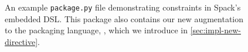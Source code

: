 \begin{figure}

\caption{An example \texttt{package.py} file demonstrating constraints in
    Spack's embedded DSL. This package also contains our new augmentation to the
    packaging language, , which we introduce in
    \cref{sec:impl-new-directive}.}
  \label{fig:example-pkg}
\end{figure}
